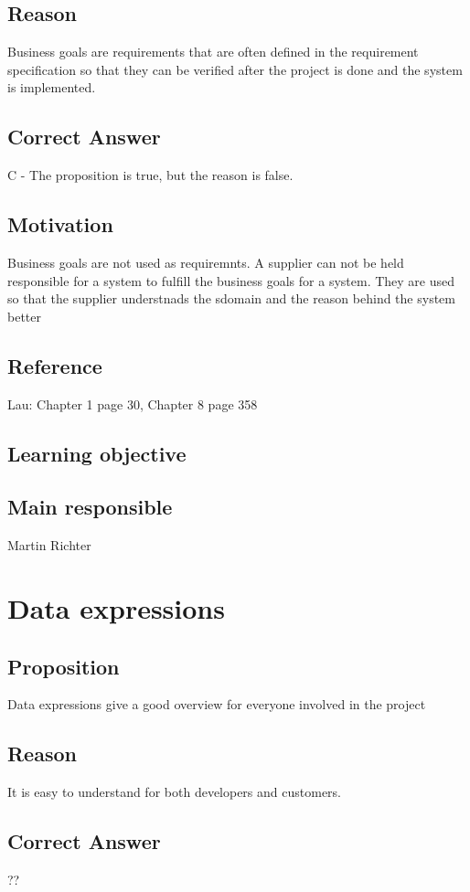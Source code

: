 \documentclass[a4paper]{article}
\begin{document}
\subsection*{Reason}
Business goals are requirements that are often defined in the requirement specification so that they can be verified after the project is done and the system is implemented.
\subsection*{Correct Answer}
C - The proposition is true, but the reason is false.
\subsection*{Motivation}
Business goals are not used as requiremnts. A supplier can not be held responsible for a system to fulfill the business goals for a system. They are used so that the supplier understnads the sdomain and the reason behind the system better

\subsection*{Reference}
Lau: Chapter 1 page 30, Chapter 8 page 358
\subsection*{Learning objective}

\subsection*{Main responsible}
Martin Richter


\section{Data expressions}
\subsection*{Proposition}
Data expressions give a good overview for everyone involved in the project
\subsection*{Reason}
It is easy to understand for both developers and customers. 
\subsection*{Correct Answer}
??
\end{document}

